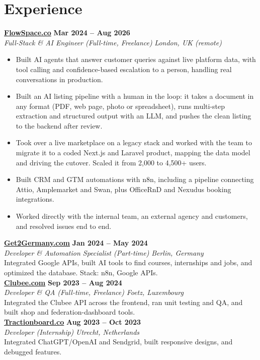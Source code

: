 \documentclass[a4paper,10pt]{article}
\newcommand{\role}[4]{%
 \textbf{#1} \hfill \textbf{#2}\\[1pt]%
 \textit{#3} \hfill \textit{#4}\\[2pt]%
}
\begin{document}
\section{Experience}

\role{\href{https://flowspace.co}{FlowSpace.co}}{Mar 2024 -- Aug 2026}{Full-Stack \& AI Engineer (Full-time, Freelance)}{London, UK (remote)}
\begin{itemize}
 \item Built AI agents that answer customer queries against live platform data, with tool calling and confidence-based escalation to a person, handling real conversations in production.
 \item Built an AI listing pipeline with a human in the loop: it takes a document in any format (PDF, web page, photo or spreadsheet), runs multi-step extraction and structured output with an LLM, and pushes the clean listing to the backend after review.
 \item Took over a live marketplace on a legacy stack and worked with the team to migrate it to a coded Next.js and Laravel product, mapping the data model and driving the cutover. Scaled it from 2,000 to 4,500+ users.
 \item Built CRM and GTM automations with n8n, including a pipeline connecting Attio, Amplemarket and Swan, plus OfficeRnD and Nexudus booking integrations.
 \item Worked directly with the internal team, an external agency and customers, and resolved issues end to end.
\end{itemize}

\role{\href{https://get2germany.com}{Get2Germany.com}}{Jan 2024 -- May 2024}{Developer \& Automation Specialist (Part-time)}{Berlin, Germany}
Integrated Google APIs, built AI tools to find courses, internships and jobs, and optimized the database. Stack: n8n, Google APIs.\\[1pt]

\role{\href{https://clubee.com}{Clubee.com}}{Sep 2023 -- Aug 2024}{Developer \& QA (Full-time, Freelance)}{Foetz, Luxembourg}
Integrated the Clubee API across the frontend, ran unit testing and QA, and built shop and federation-dashboard tools.\\[1pt]

\role{\href{https://tractionboard.co}{Tractionboard.co}}{Aug 2023 -- Oct 2023}{Developer (Internship)}{Utrecht, Netherlands}
Integrated ChatGPT/OpenAI and Sendgrid, built responsive designs, and debugged features.
\end{document}
